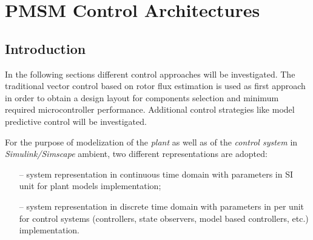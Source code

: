 \documentclass[11pt,a4paper,oneside]{book}
\numberwithin{equation}{section}
\theoremstyle{it}
\theoremstyle{definition}
\begin{document}
\chapter{PMSM Control Architectures}
\section{Introduction}
In the following sections different control approaches will be investigated. The traditional vector control based on rotor flux estimation is used as first approach in order to obtain a design layout for components selection and minimum required microcontroller performance. Additional control strategies like model predictive control will be investigated.

For the purpose of modelization of the \textit{plant} as well as of the \textit{control system} in \textit{Simulink/Simscape} ambient, two different representations are adopted:
\begin{itemize}
	\item[--] system representation in continuous time domain with parameters in SI unit for plant models implementation;
	\item[--] system representation in discrete time domain with parameters in per unit for control systems (controllers, state observers, model based controllers, etc.) implementation.	
\end{itemize}
\end{document}
